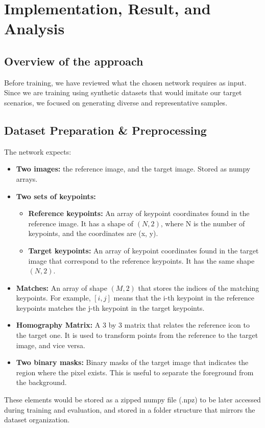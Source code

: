 \chapter{Implementation, Result, and Analysis}
\section{Overview of the approach}
Before training, we have reviewed what the chosen network requires as input.
Since we are training using synthetic datasets that would imitate our target
scenarios, we focused on generating diverse and representative samples.
\section{Dataset Preparation \& Preprocessing}
The network expects:
\begin{itemize}
    \item \textbf{Two images:} the reference image, and the target image. Stored as numpy arrays.
    \item \textbf{Two sets of keypoints:}
          \begin{itemize}
              \item \textbf{Reference keypoints:} An array of keypoint coordinates found in the reference
                    image. It has a shape of $(N, 2)$, where N is the number of keypoints, and the coordinates are (x, y).
              \item \textbf{Target keypoints:} An array of keypoint coordinates found in the target image that correspond to the reference keypoints. It has the same shape $(N, 2)$.
          \end{itemize}
    \item \textbf{Matches:} An array of shape $(M, 2)$ that stores the indices of the matching keypoints. For example, $[i, j]$ means that the i-th keypoint in the reference keypoints matches the j-th keypoint in the target keypoints.
    \item \textbf{Homography Matrix: } A 3 by 3 matrix that relates the reference icon to the target one. It is used to transform points from the reference to the target image, and vice versa.
    \item \textbf{Two binary masks:} Binary masks of the target image that indicates the region where the pixel exists. This is useful to separate the foreground from the background.
\end{itemize}
These elements would be stored as a zipped numpy file (.npz) to be later accessed during training and evaluation, and stored in a folder structure that mirrors the dataset organization.
